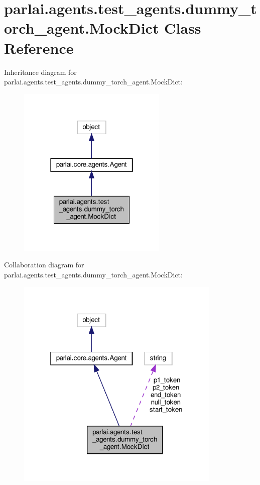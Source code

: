 \hypertarget{classparlai_1_1agents_1_1test__agents_1_1dummy__torch__agent_1_1MockDict}{}\section{parlai.\+agents.\+test\+\_\+agents.\+dummy\+\_\+torch\+\_\+agent.\+Mock\+Dict Class Reference}
\label{classparlai_1_1agents_1_1test__agents_1_1dummy__torch__agent_1_1MockDict}


Inheritance diagram for parlai.\+agents.\+test\+\_\+agents.\+dummy\+\_\+torch\+\_\+agent.\+Mock\+Dict\+:
\nopagebreak
\begin{figure}[H]
\begin{center}
\leavevmode
\includegraphics[width=202pt]{classparlai_1_1agents_1_1test__agents_1_1dummy__torch__agent_1_1MockDict__inherit__graph}
\end{center}
\end{figure}


Collaboration diagram for parlai.\+agents.\+test\+\_\+agents.\+dummy\+\_\+torch\+\_\+agent.\+Mock\+Dict\+:
\nopagebreak
\begin{figure}[H]
\begin{center}
\leavevmode
\includegraphics[width=277pt]{classparlai_1_1agents_1_1test__agents_1_1dummy__torch__agent_1_1MockDict__coll__graph}
\end{center}
\end{figure}
